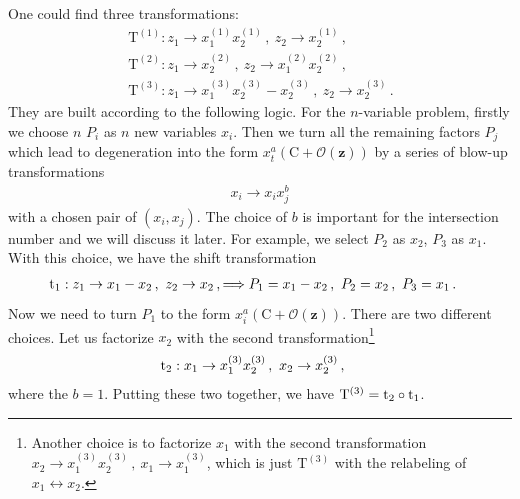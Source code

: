 \documentclass[a4paper,11pt]{article}
\newcommand{\nn}{\nonumber}
\newcommand{\nT}{\mathrm{T}}
\begin{document}
One could find three transformations:
\begin{align}
&\nT^{(1)}: z_1\to x_1^{(1)}x_2^{(1)} \,,\ z_2\to x_2^{(1)} \, , \nn\\
&\nT^{(2)}: z_1\to x_2^{(2)} \,,\ z_2\to x_1^{(2)}x_2^{(2)} \, , \nn\\
&\nT^{(3)}: z_1\to x_1^{(3)}x_2^{(3)}-x_2^{(3)}  \,,\  z_2\to x_2^{(3)}  \, .~~~\label{3-T}
\end{align}
They are built according to the following logic. For the $n$-variable problem,  firstly we choose $n$ $P_i$ as $n$ new variables $x_i$. Then we turn  all the remaining factors $P_j$ which lead to degeneration into the form {  $x_t^a(\text{C}+\mathcal{O}(\bm{z}))$} by a series of blow-up transformations  
\begin{align}
x_i\to x_i x_j^b  \label{eq:Tblowup}
\end{align}
with a chosen pair of $(x_i,x_j)$.
The choice of $b$ is important for the intersection number and we will discuss it later.  For example, we select $P_2$ as $x_2$, $P_3$ as $x_1$. With this choice,  we have the shift transformation
\begin{align}
&{\text t}_1: z_1\to x_1-x_2\,, \ z_2\to x_2\, , \Longrightarrow 
P_1=x_1-x_2\,,\ P_2=x_2\,,\  P_3=x_1\,.
\end{align}
Now we need to turn $P_1$ to the form $x_i^a(\text{C}+\mathcal{O}(\bm{z}))$. There are two different choices. Let us factorize $x_2$ with the second transformation\footnote{Another choice is to factorize $x_1$ with the second transformation $x_2\to x_1^{(3)}x_2^{(3)}\,, \ x_1\to x_1^{(3)}$, which is just $\nT^{(3)}$ with the relabeling of $x_1\leftrightarrow x_2$.}
\begin{align}
&{\text t}_2: x_1\to x_1^{(3)}x_2^{(3)}\,, \ x_2\to x_2^{(3)}\, ,
\end{align}
where the $b=1$. 
Putting these two together, we have $\nT^{(3)}={\text t}_2\circ {\text t}_1$.  
\end{document}
